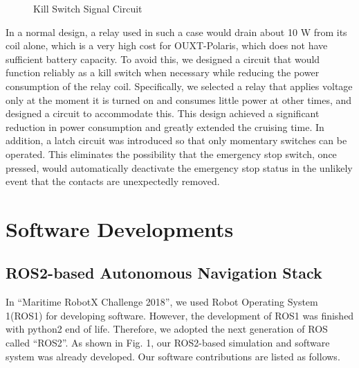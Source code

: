 \documentclass[lettersize,journal]{IEEEtran}
\begin{document}
\begin{figure}[H]
    \begin{center}
    \end{center}
    \caption{Kill Switch Signal Circuit}
    \label{fig:kill_switch_signal_circuit}
\end{figure}

In a normal design, a relay used in such a case would drain about 10 W from its coil alone, which is a very high cost for OUXT-Polaris, which does not have sufficient battery capacity.
To avoid this, we designed a circuit that would function reliably as a kill switch when necessary while reducing the power consumption of the relay coil.
Specifically, we selected a relay that applies voltage only at the moment it is turned on and consumes little power at other times, and designed a circuit to accommodate this.
This design achieved a significant reduction in power consumption and greatly extended the cruising time.
In addition, a latch circuit was introduced so that only momentary switches can be operated.
This eliminates the possibility that the emergency stop switch, once pressed,
would automatically deactivate the emergency stop status in the unlikely event that the contacts are unexpectedly removed.

\section{Software Developments}
\subsection{ROS2-based Autonomous Navigation Stack}
In “Maritime RobotX Challenge 2018”, we used Robot Operating System 1(ROS1) for developing software.
However, the development of ROS1 was finished with python2 end of life.
Therefore, we adopted the next generation of ROS called “ROS2”. \cite{ROS2_paper}
As shown in Fig. 1, our ROS2-based simulation and software system was already developed.
Our software contributions are listed as follows.
\end{document}
